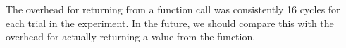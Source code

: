 \noindent The overhead for returning from a function call was consistently 16 cycles for each trial in the experiment. In the future, we should compare this with the overhead for actually returning a value from the function.
\newline
\newline

